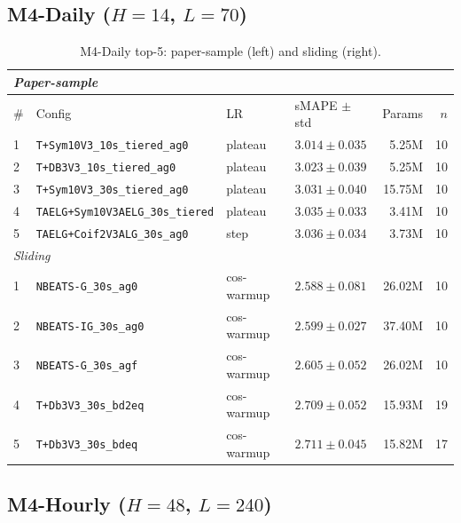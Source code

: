 \documentclass[11pt,a4paper]{article}
\begin{document}
\subsection{\texorpdfstring{M4-Daily ($H=14$, $L=70$)}{M4-Daily (H=14, L=70)}}

\begin{table}[h]
\centering
\scriptsize
\setlength{\tabcolsep}{2.5pt}
\caption{M4-Daily top-5: paper-sample (left) and sliding (right).}
\label{tab:m4_daily_full}
\begin{tabular}{@{}llllrr@{}}
\toprule
\multicolumn{6}{l}{\textit{Paper-sample}} \\
\midrule
\# & Config & LR & sMAPE $\pm$ std & Params & $n$ \\
\midrule
1 & \texttt{T+Sym10V3\_10s\_tiered\_ag0}    & plateau & $\mathbf{3.014 \pm 0.035}$ & 5.25M & 10 \\
2 & \texttt{T+DB3V3\_10s\_tiered\_ag0}      & plateau & $3.023 \pm 0.039$          & 5.25M & 10 \\
3 & \texttt{T+Sym10V3\_30s\_tiered\_ag0}    & plateau & $3.031 \pm 0.040$          & 15.75M & 10 \\
4 & \texttt{TAELG+Sym10V3AELG\_30s\_tiered} & plateau & $3.035 \pm 0.033$          & 3.41M & 10 \\
5 & \texttt{TAELG+Coif2V3ALG\_30s\_ag0}     & step    & $3.036 \pm 0.034$          & 3.73M & 10 \\
\midrule
\multicolumn{6}{l}{\textit{Sliding}} \\
\midrule
1 & \texttt{NBEATS-G\_30s\_ag0}             & cos-warmup & $\mathbf{2.588 \pm 0.081}$ & 26.02M & 10 \\
2 & \texttt{NBEATS-IG\_30s\_ag0}            & cos-warmup & $2.599 \pm 0.027$          & 37.40M & 10 \\
3 & \texttt{NBEATS-G\_30s\_agf}             & cos-warmup & $2.605 \pm 0.052$          & 26.02M & 10 \\
4 & \texttt{T+Db3V3\_30s\_bd2eq}            & cos-warmup & $2.709 \pm 0.052$          & 15.93M & 19 \\
5 & \texttt{T+Db3V3\_30s\_bdeq}             & cos-warmup & $2.711 \pm 0.045$          & 15.82M & 17 \\
\bottomrule
\end{tabular}
\end{table}

\subsection{\texorpdfstring{M4-Hourly ($H=48$, $L=240$)}{M4-Hourly (H=48, L=240)}}
\end{document}
